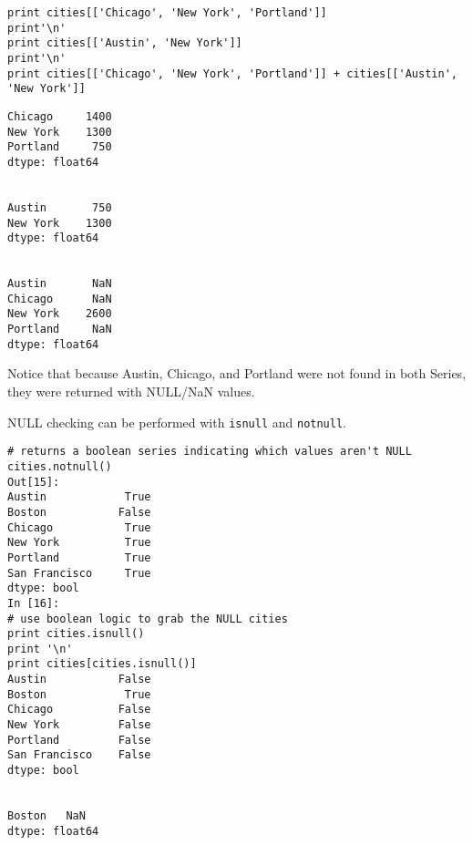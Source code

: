 \documentclass[KSmain.tex]{subfiles}
\begin{document}
\begin{framed}
\begin{verbatim}
print cities[['Chicago', 'New York', 'Portland']]
print'\n'
print cities[['Austin', 'New York']]
print'\n'
print cities[['Chicago', 'New York', 'Portland']] + cities[['Austin', 'New York']]
\end{verbatim}
\end{framed}
\begin{verbatim}
Chicago     1400
New York    1300
Portland     750
dtype: float64


Austin       750
New York    1300
dtype: float64


Austin       NaN
Chicago      NaN
New York    2600
Portland     NaN
dtype: float64
\end{verbatim}

Notice that because Austin, Chicago, and Portland were not found in both Series, they were returned with NULL/NaN values.

NULL checking can be performed with \texttt{isnull} and \texttt{notnull}.
\begin{framed}
\begin{verbatim}
# returns a boolean series indicating which values aren't NULL
cities.notnull()
Out[15]:
Austin            True
Boston           False
Chicago           True
New York          True
Portland          True
San Francisco     True
dtype: bool
In [16]:
# use boolean logic to grab the NULL cities
print cities.isnull()
print '\n'
print cities[cities.isnull()]
Austin           False
Boston            True
Chicago          False
New York         False
Portland         False
San Francisco    False
dtype: bool


Boston   NaN
dtype: float64
\end{verbatim}
\end{framed}
\end{document}
